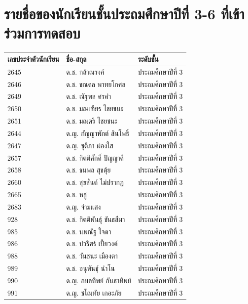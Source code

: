 \section{รายชื่อของนักเรียนชั้นประถมศึกษาปีที่ 3-6 ที่เข้าร่วมการทดสอบ}
\begin{center}
    \begin{tabular}{ |p{3cm}|p{4cm}|p{3cm}| }
        \hline
        เลขประจำตัวนักเรียน & ชื่อ-สกุล & ระดับชั้น\\
        \hline
        2645 & ด.ช. กล้าณรงค์ & ประถมศึกษาปีที่ 3\\
        \hline
        2646 & ด.ช. ขณดล พาทยโกศล & ประถมศึกษาปีที่ 3\\
        \hline
        2649 & ด.ช. ณัฐพล ศรคำ & ประถมศึกษาปีที่ 3\\
        \hline
        2650 & ด.ช. มณเฑียร ไชยชนะ & ประถมศึกษาปีที่ 3\\
        \hline
        2651 & ด.ช. มณตรี ไชยชนะ & ประถมศึกษาปีที่ 3\\
        \hline
        2644 & ด.ญ. กัญญาพักต์ สินโพธิ์ & ประถมศึกษาปีที่ 3\\
        \hline
        2647 & ด.ญ. ชุติภา ผ่องใส & ประถมศึกษาปีที่ 3\\
        \hline
        2657 & ด.ช. กิตติศักดิ์ ปัญญาดี & ประถมศึกษาปีที่ 3\\
        \hline
        2658 & ด.ช. ธนพล สุขตุ้ย & ประถมศึกษาปีที่ 3\\
        \hline
        2660 & ด.ช. สุขสันต์ ไม่ปรากฎ & ประถมศึกษาปีที่ 3\\
        \hline
        2665 & ด.ช. หลู่ & ประถมศึกษาปีที่ 3\\
        \hline
        2683 & ด.ญ. จ่ามแสง & ประถมศึกษาปีที่ 3\\
        \hline
        928 & ด.ช. กิตติพันธุ์ ขันธสีมา & ประถมศึกษาปีที่ 3\\
        \hline
        985 & ด.ช. นพณัฐ ใจดา & ประถมศึกษาปีที่ 3\\
        \hline
        986 & ด.ช. ปวริศร์ เปี้ยวงค์ & ประถมศึกษาปีที่ 3\\
        \hline
        988 & ด.ช. วันชนะ เมืองตา & ประถมศึกษาปีที่ 3\\
        \hline
        989 & ด.ช. อนุพันธุ์ นำโน & ประถมศึกษาปีที่ 3\\
        \hline
        990 & ด.ญ. กมลทิพย์ กันธาทิพย์ & ประถมศึกษาปีที่ 3\\
        \hline
        991 & ด.ญ. ชโณทัย เกอะภัย & ประถมศึกษาปีที่ 3\\
        \hline

\end{tabular}
\end{center}
